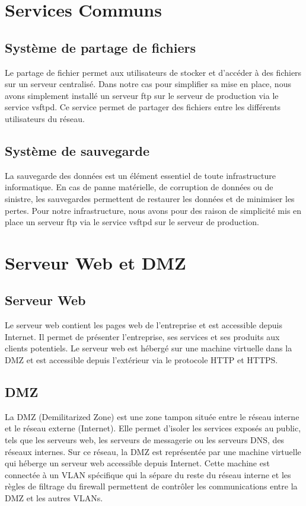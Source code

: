 \documentclass[a4paper,12pt,openany]{report}
\begin{document}
        \section{Services Communs}
            \subsection{Système de partage de fichiers}
                Le partage de fichier permet aux utilisateurs de stocker et d'accéder à des fichiers sur un serveur centralisé. Dans notre cas pour simplifier sa mise en place, nous avons simplement installé un serveur ftp sur le serveur de production via le service vsftpd. Ce service permet de partager des fichiers entre les différents utilisateurs du réseau.
            \subsection{Système de sauvegarde}
                La sauvegarde des données est un élément essentiel de toute infrastructure informatique. En cas de panne matérielle, de corruption de données ou de sinistre, les sauvegardes permettent de restaurer les données et de minimiser les pertes. Pour notre infrastructure, nous avons pour des raison de simplicité mis en place un serveur ftp via le service vsftpd sur le serveur de production.
        \section{Serveur Web et DMZ}
            \subsection{Serveur Web}
                Le serveur web contient les pages web de l'entreprise et est accessible depuis Internet. Il permet de présenter l'entreprise, ses services et ses produits aux clients potentiels. Le serveur web est hébergé sur une machine virtuelle dans la DMZ et est accessible depuis l'extérieur via le protocole HTTP et HTTPS.
            \subsection{DMZ}
                La DMZ (Demilitarized Zone) est une zone tampon située entre le réseau interne et le réseau externe (Internet). Elle permet d'isoler les services exposés au public, tels que les serveurs web, les serveurs de messagerie ou les serveurs DNS, des réseaux internes. Sur ce réseau, la DMZ est représentée par une machine virtuelle qui héberge un serveur web accessible depuis Internet. Cette machine est connectée à un VLAN spécifique qui la sépare du reste du réseau interne et les règles de filtrage du firewall permettent de contrôler les communications entre la DMZ et les autres VLANs.
\end{document}
